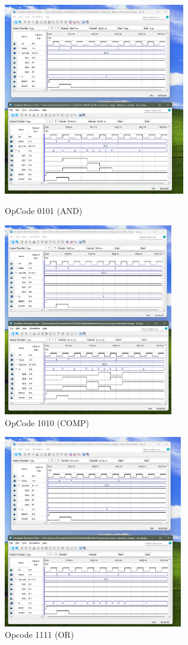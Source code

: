 \documentclass[11pt,a4paper,english]{article}
\begin{document}
    \begin{figure}[h]
          \begin{minipage}[c]{0.4\linewidth}
          \centering
          \includegraphics[height=84mm]{./ss/p4_and(0101).png}
          \caption{OpCode 0101 (AND)}
          \end{minipage}
          \hspace*{50pt}
          \begin{minipage}[c]{0.4\linewidth}
          \centering
          \includegraphics[height=84mm]{./ss/p4_comp(1010).png}
          \caption{OpCode 1010 (COMP)}
          \end{minipage}%
    \end{figure}
      
    \begin{figure}[h]
      \centering
      \includegraphics[height=84mm]{./ss/p4_or(1111).png}
      \caption{Opcode 1111 (OR)}
    \end{figure}
      
\end{document}

